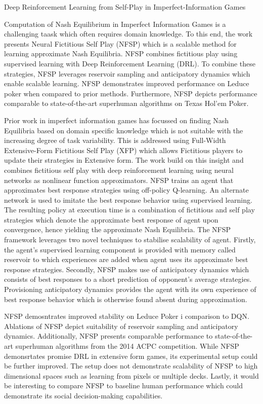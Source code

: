 \documentclass[11pt,letterpaper]{article}
\begin{document}
\begin{center}
  \large{Deep Reinforcement Learning from Self-Play in Imperfect-Information Games}
\end{center}
Computation of Nash Equilibrium in Imperfect Information Games is a challenging taask which often requires domain knowledge. To this end, the work presents Neural Fictitious Self Play (NFSP) which is a scalable method for learning approximate Nash Equilibria. NFSP combines fictitious play using supervised learning with Deep Reinforcement Learning (DRL). To combine these strategies, NFSP leverages reservoir sampling and anticipatory dynamics which enable scalable learning. NFSP demonstrates improved performance on Leduce poker when compared to prior methods. Furthermore, NFSP depicts performance comparable to state-of-the-art superhuman algorithms on Texas Hol'em Poker. 

Prior work in imperfect information games has focussed on finding Nash Equilibria based on domain specific knowledge which is not suitable with the increasing degree of task variability. This is addressed using Full-Width Extensive-Form Fictitious Self Play (XFP) which allows Fictitious players to update their strategies in Extensive form. The work build on this insight and combines fictitious self play with deep reinforcement learning using neural networks as nonlinear function approximators. NFSP trains an agent that approximates best response strategies using off-policy Q-learning. An alternate network is used to imitate the best response behavior using supervised learning. The resulting policy at execution time is a combination of fictitious and self play strategies which denote the approximate best response of agent upon convergence, hence yielding the approximate Nash Equilibria. The NFSP framework leverages two novel techniques to stabilise scalability of agent. Firstly, the agent's supervised learning component is provided with memory called reservoir to which experiences are added when agent uses its approximate best response strategies. Secondly, NFSP makes use of anticipatory dynamics which consists of best responses to a short prediction of opponent's average strategies. Provisioning anticipatory dynamics provides the agent with its own experience of best response behavior which is otherwise found absent during approximation. 

NFSP demosntrates improved stability on Leduce Poker i comparison to DQN. Ablations of NFSP depict suitability of reservoir sampling and anticipatory dynamics. Additionally, NFSP presents comparable performance to state-of-the-art superhuman algorithms from the 2014 ACPC competition. While NFSP demonsrtates promise DRL in extensive form games, its experimental setup could be further improved. The setup does not demonstrate scalability of NFSP to high dimensional spaces such as learning from pixels or multiple decks. Lastly, it would be interesting to compare NFSP to baseline human performance which could demonstrate its social decision-making capabilities. 
\end{document}
